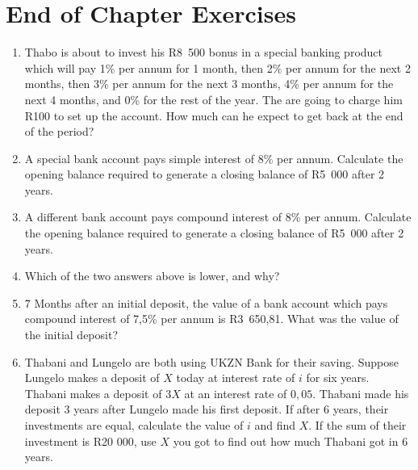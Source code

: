 \section{End of Chapter Exercises}
\begin{enumerate}
\item{Thabo is about to invest his R8~500 bonus in a special banking product which will pay 1\% per annum for 1 month, then 2\% per annum for the next 2 months, then 3\% per annum for the next 3 months, 4\% per annum for the next 4 months, and 0\% for the rest of the year. The are going to charge him R100 to set up the account. How much can he expect to get back at the end of the period?}

\item{A special bank account pays simple interest of 8\% per annum. Calculate the opening balance required to generate a closing balance of R5~000 after 2 years.}

\item{A different bank account pays compound interest of 8\% per annum. Calculate the opening balance required to generate a closing balance of R5~000 after 2 years.}

\item{Which of the two answers above is lower, and why?}

\item{7 Months after an initial deposit, the value of a bank account which pays compound interest of 7,5\% per annum is R3~650,81. What was the value of the initial deposit?}


\item{Thabani and Lungelo are both using UKZN Bank for their saving. Suppose Lungelo makes a deposit of $X$ today at interest rate of $i$ for six years. Thabani makes a deposit of $3X$ at an interest rate of $0,05$. Thabani made his deposit 3 years after Lungelo made his first deposit. If after 6 years, their investments are equal, calculate the value of $i$ and find $X$. If the sum of their investment is R20 000, use $X$ you got to find out how much Thabani got in 6 years.}


\end{enumerate}
